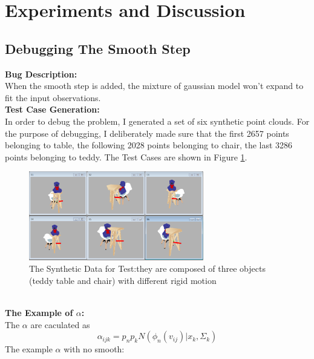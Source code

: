 \section{Experiments and Discussion}
\label{sec:exp}
\subsection{Debugging The Smooth Step}
\textbf{Bug Description:}\\
When the smooth step is added, the mixture of gaussian model won't expand to fit the input observations.\\
\textbf{Test Case Generation:}\\
In order to debug the problem, I generated a set of six synthetic point clouds. For the purpose of debugging, I deliberately made sure that the first 2657 points belonging to table, the following 2028 points belonging to chair, the last 3286 points belonging to teddy. The Test Cases are shown in Figure \ref{fig:syn-data}.
\begin{figure}[ht]
  \centering
  \includegraphics[width=3.0in]{images/synthetic_data}
  \caption{The Synthetic Data for Test:they are composed of three objects (teddy table and chair) with different rigid motion}
  \label{fig:syn-data}
\end{figure}\\
\textbf{The Example of $\alpha$:}\\
The $\alpha$ are caculated as
$$\alpha_{ijk}=p_np_kN(\phi_n(v_{ij})|x_k,\Sigma_k)$$
The example $\alpha$ with no smooth:\\
